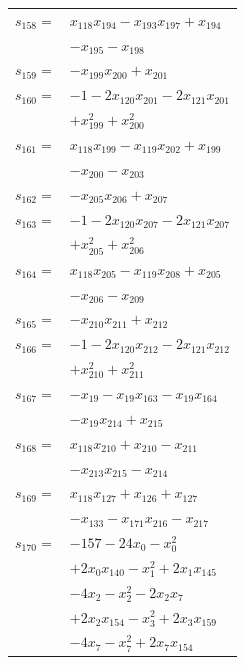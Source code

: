 \begin{longtable}{@{}r@{\;}l@{}}
\(s_{158}=\) & \(\displaystyle x_{118}x_{194} -x_{193}x_{197} +x_{194}\) \\
 & \(\displaystyle -x_{195} -x_{198}\) \\[3pt]
\(s_{159}=\) & \(\displaystyle -x_{199}x_{200} +x_{201}\) \\[3pt]
\(s_{160}=\) & \(\displaystyle -1 -2x_{120}x_{201} -2x_{121}x_{201}\) \\
 & \(\displaystyle +x_{199}^{2} +x_{200}^{2}\) \\[3pt]
\(s_{161}=\) & \(\displaystyle x_{118}x_{199} -x_{119}x_{202} +x_{199}\) \\
 & \(\displaystyle -x_{200} -x_{203}\) \\[3pt]
\(s_{162}=\) & \(\displaystyle -x_{205}x_{206} +x_{207}\) \\[3pt]
\(s_{163}=\) & \(\displaystyle -1 -2x_{120}x_{207} -2x_{121}x_{207}\) \\
 & \(\displaystyle +x_{205}^{2} +x_{206}^{2}\) \\[3pt]
\(s_{164}=\) & \(\displaystyle x_{118}x_{205} -x_{119}x_{208} +x_{205}\) \\
 & \(\displaystyle -x_{206} -x_{209}\) \\[3pt]
\(s_{165}=\) & \(\displaystyle -x_{210}x_{211} +x_{212}\) \\[3pt]
\(s_{166}=\) & \(\displaystyle -1 -2x_{120}x_{212} -2x_{121}x_{212}\) \\
 & \(\displaystyle +x_{210}^{2} +x_{211}^{2}\) \\[3pt]
\(s_{167}=\) & \(\displaystyle -x_{19} -x_{19}x_{163} -x_{19}x_{164}\) \\
 & \(\displaystyle -x_{19}x_{214} +x_{215}\) \\[3pt]
\(s_{168}=\) & \(\displaystyle x_{118}x_{210} +x_{210} -x_{211}\) \\
 & \(\displaystyle -x_{213}x_{215} -x_{214}\) \\[3pt]
\(s_{169}=\) & \(\displaystyle x_{118}x_{127} +x_{126} +x_{127}\) \\
 & \(\displaystyle -x_{133} -x_{171}x_{216} -x_{217}\) \\[3pt]
\(s_{170}=\) & \(\displaystyle -157 -24x_{0} -x_{0}^{2}\) \\
 & \(\displaystyle +2x_{0}x_{140} -x_{1}^{2} +2x_{1}x_{145}\) \\
 & \(\displaystyle -4x_{2} -x_{2}^{2} -2x_{2}x_{7}\) \\
 & \(\displaystyle +2x_{2}x_{154} -x_{3}^{2} +2x_{3}x_{159}\) \\
 & \(\displaystyle -4x_{7} -x_{7}^{2} +2x_{7}x_{154}\) \\

\end{longtable}
